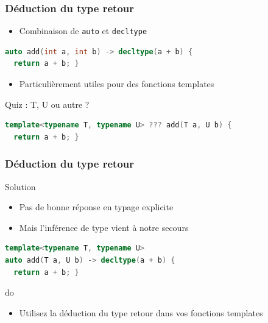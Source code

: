 \documentclass[C++.tex]{subfiles}
\begin{document}
\begin{frame}[fragile]
	\frametitle{Déduction du type retour}
	\begin{itemize}
		\item Combinaison de \lstinline|auto| et \lstinline|decltype|
	\end{itemize}

	\begin{lstlisting}[language=C++]
auto add(int a, int b) -> decltype(a + b) {
  return a + b; }\end{lstlisting}

	\begin{itemize}
		\item Particulièrement utiles pour des fonctions templates
	\end{itemize}

	\begin{block}{Quiz : T, U ou autre ?}
		\begin{lstlisting}[language=C++]
template<typename T, typename U> ??? add(T a, U b) {
  return a + b; }\end{lstlisting}

	\end{block}
\end{frame}

\begin{frame}[fragile]
	\frametitle{Déduction du type retour}
	\begin{block}{Solution}
		\begin{itemize}
			\item Pas de bonne réponse en typage explicite
			\item Mais l'inférence de type vient à notre secours
		\end{itemize}
	\end{block}

	\begin{lstlisting}[language=C++]
template<typename T, typename U>
auto add(T a, U b) -> decltype(a + b) {
  return a + b; }\end{lstlisting}

	\begin{exampleblock}{do}
		\begin{itemize}
			\item Utilisez la déduction du type retour dans vos fonctions templates
		\end{itemize}
	\end{exampleblock}
\end{frame}
\end{document}
